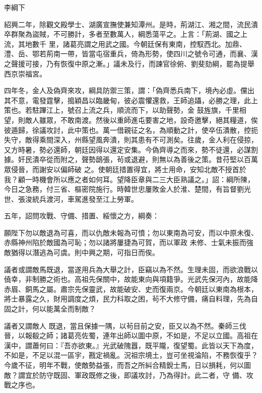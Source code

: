 
\begin{pinyinscope}

 李綱下



 紹興二年，除觀文殿學士、湖廣宣撫使兼知潭州。是時，荊湖江、湘之間，流民潰卒群聚為盜賊，不可勝計，多者至數萬人，綱悉蕩平之。上言：「荊湖、國之上流，其地數千
 里，諸葛亮謂之用武之國。今朝廷保有東南，控馭西北。加鼎、澧、岳、鄂若荊南一帶，皆當屯宿重兵，倚為形勢，使四川之號令可通，而襄、漢之聲援可接，乃有恢復中原之漸。」議未及行，而諫官徐俯、劉斐劾綱，罷為提舉西京崇福宮。



 四年冬，金人及偽齊來攻，綱具防禦三策，謂：「偽齊悉兵南下，境內必虛。儻出其不意，電發霆擊，搗穎昌以臨畿甸，彼必震懼還救，王師追躡，必勝之理，此上策也。若駐蹕江上，號召上流之兵，順流而下，以助聲勢，金
 鼓旌旗，千里相望，則敵人雖眾，不敢南渡。然後以重師進屯要害之地，設奇邀擊，絕其糧道，俟彼遁歸，徐議攻討，此中策也。萬一借親征之名，為順動之計，使卒伍潰散，控扼失守，敵得乘間深入，州縣望風奔潰，則其患有不可測矣。往歲，金人利在侵掠，又方時暑，勢必還師，朝廷因得以還定安集。今偽齊導之而來，勢不徒還，必謀割據。奸民潰卒從而附之，聲勢鴟張，茍或退避，則無以為善後之策。昔苻堅以百萬眾侵晉，而謝安以偏師破
 之。使朝廷措置得宜，將士用命，安知北敵不授首於我？顧一時機會所以應之者如何耳。望降臣章與二三大臣熟議之。」詔：綱所陳，今日之急務，付三省、樞密院施行。時韓世忠屢敗金人於淮、楚間，有旨督劉光世、張浚統兵渡河，車駕進發至江上勞軍。



 五年，詔問攻戰、守備、措置、綏懷之方，綱奏：



 願陛下勿以敵退為可喜，而以仇敵未報為可憤；勿以東南為可安，而以中原未復、赤縣神州陷於敵國為可恥；勿以諸將屢捷為可賀，而以軍政
 未修、士氣未振而強敵猶得以潛逃為可虞。則中興之期，可指日而俟。



 議者或謂敵馬既退，當遂用兵為大舉之計，臣竊以為不然。生理未固，而欲浪戰以僥幸，非制勝之術也。高祖先保關中，故能東向與項籍爭。光武先保河內，故能降赤眉、銅馬之屬。肅宗先保靈武，故能破安、史而復兩京。今朝廷以東南為根本，將士暴露之久，財用調度之煩，民力科取之困，茍不大修守備，痛自料理，先為自固之計，何以能萬全而制敵？



 議者又謂敵人
 既退，當且保據一隅，以茍目前之安，臣又以為不然。秦師三伐晉，以報殽之師；諸葛亮佐蜀，連年出師以圖中原，不如是，不足以立國。高祖在漢中，謂蕭何曰：『吾亦欲東。』光武破隗囂，既平隴，復望蜀。此皆以天下為度，不如是，不足以混一區宇，戡定禍亂。況祖宗境土，豈可坐視淪陷，不務恢復乎？今歲不征，明年不戰，使敵勢益張，而吾之所糾合精銳士馬，日以損耗，何以圖敵？謂宜於防守既固、軍政既修之後，即議攻討，乃為得計。此二者，守
 備、攻戰之序也。




\end{pinyinscope}
